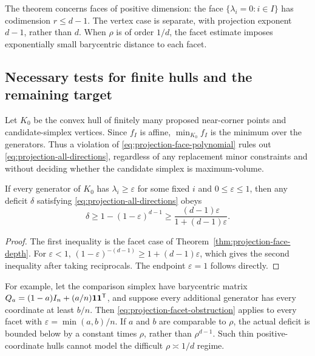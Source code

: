 The theorem concerns faces of positive dimension: the face
$\{\lambda_i=0:i\in I\}$ has codimension $r\leq d-1$.
The vertex case is separate, with projection exponent $d-1$, rather
than $d$.  When $\rho$ is of order $1/d$, the facet estimate imposes
exponentially small barycentric distance to each facet.

\subsection{Necessary tests for finite hulls and the remaining target}

Let $K_0$ be the convex hull of finitely many proposed near-corner
points and candidate-simplex vertices.  Since $f_I$ is affine,
$\min_{K_0}f_I$ is the minimum over the generators.  Thus a violation
of \eqref{eq:projection-face-polynomial} rules out
\eqref{eq:projection-all-directions}, regardless of any replacement
minor constraints and without deciding whether the candidate simplex
is maximum-volume.

\begin{proposition}
\label{prop:projection-finite-hull-obstruction}
If every generator of $K_0$ has $\lambda_i\geq\varepsilon$ for
some fixed $i$ and $0\leq\varepsilon\leq1$, then any deficit
$\delta$ satisfying \eqref{eq:projection-all-directions} obeys
\begin{equation}
 \delta\geq1-(1-\varepsilon)^{d-1}
 \geq\frac{(d-1)\varepsilon}{1+(d-1)\varepsilon}.
 \label{eq:projection-facet-obstruction}
\end{equation}
\end{proposition}

\begin{proof}
The first inequality is the facet case of
Theorem~\ref{thm:projection-face-depth}.  For $\varepsilon<1$,
$(1-\varepsilon)^{-(d-1)}\geq1+(d-1)\varepsilon$, which gives
the second inequality after taking reciprocals.  The endpoint
$\varepsilon=1$ follows directly.
\end{proof}

For example, let the comparison simplex have barycentric matrix
$Q_a=(1-a)I_n+(a/n)\mathbf 1\mathbf 1^{\mathsf T}$, and suppose every
additional generator has every coordinate at least $b/n$.
Then \eqref{eq:projection-facet-obstruction} applies to every facet
with $\varepsilon=\min(a,b)/n$.  If $a$ and $b$ are comparable to
$\rho$, the actual deficit is bounded below by a constant times
$\rho$, rather than $\rho^{d-1}$.  Such thin positive-coordinate
hulls cannot model the difficult $\rho\asymp1/d$ regime.

